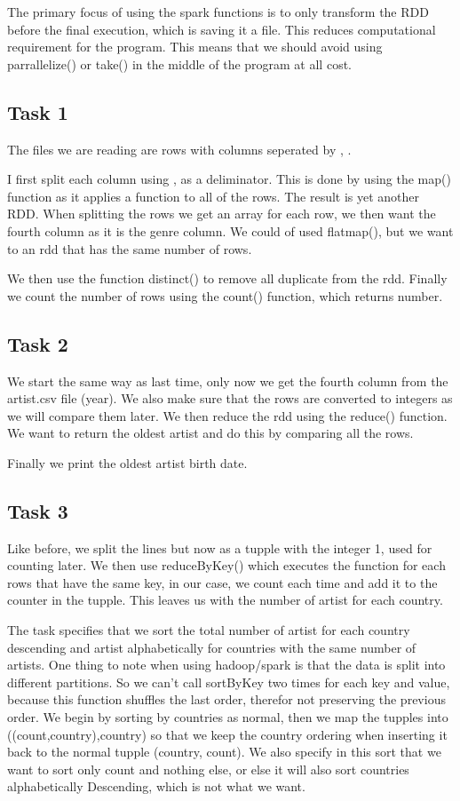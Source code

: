 \documentclass[12pt]{article}
\begin{document}
The primary focus of using the spark functions is to only transform the RDD before the final execution, which is saving it a file. This reduces computational requirement for the program. This means that we should avoid using parrallelize() or take() in the middle of the program at all cost.

\subsection{Task 1}

The files we are reading are rows with columns seperated by , .

I first split each column using , as a deliminator. This is done by using the map() function as it applies a function to all of the rows. The result is yet another RDD. When splitting the rows we get an array for each row, we then want the fourth column as it is the genre column. We could of used flatmap(), but we want to an rdd that has the same number of rows.

We then use the function distinct() to remove all duplicate from the rdd. Finally we count the number of rows using the count() function, which returns  number.


\subsection{Task 2}

We start the same way as last time, only now we get the fourth column from the artist.csv file (year). We also make sure that the rows are converted to integers as we will compare them later. We then reduce the rdd using the reduce() function. We want to return the oldest artist and do this by comparing all the rows.

Finally we print the oldest artist birth date.

\subsection{Task 3}

Like before, we split the lines but now as a tupple with the integer 1, used for counting later. We then use reduceByKey() which executes the function for each rows that have the same key, in our case, we count each time and add it to the counter in the tupple. This leaves us with the number of artist for each country.

The task specifies that we sort the total number of artist for each country descending and artist alphabetically for countries with the same number of artists. One thing to note when using hadoop/spark is that the data is split into different partitions. So we can't call sortByKey two times for each key and value, because this function shuffles the last order, therefor not preserving the previous order. We begin by sorting by countries as normal, then we map the tupples into ((count,country),country) so that we keep the country ordering when inserting it back to the normal tupple (country, count). We also specify in this sort that we want to sort only count and nothing else, or else it will also sort countries alphabetically Descending, which is not what we want.
\end{document}
